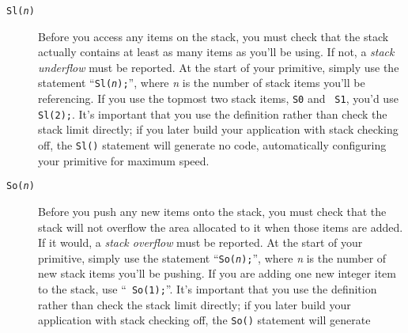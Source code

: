 \documentclass[twocolumn]{article}
\begin{document}
\begin{description}
\item[{\tt Sl({\em n})}]        Before you access any items on the
                                stack, you must check that the stack
                                actually contains at least as many 
                                items as you'll be using.  If not,
                                a {\em stack underflow} must be
                                reported.  At the start of your
                                primitive, simply use the statement
                                ``{\tt Sl({\em n});}'', where {\em n}
                                is the number of stack items you'll be
                                referencing.  If you use the topmost
                                two stack items, {\tt S0} and {\tt
                                S1}, you'd use {\tt Sl(2);}.  It's
                                important that you use the definition
                                rather than check the stack limit
                                directly; if you later build your
                                application with stack checking off,
                                the {\tt Sl()} statement will generate
                                no code, automatically configuring
                                your primitive for maximum speed.
\item[{\tt So({\em n})}]        Before you push any new items onto the
                                stack, you must check that the stack
                                will not overflow the area allocated
                                to it when those items are added.
                                If it would,
                                a {\em stack overflow} must be
                                reported.  At the start of your
                                primitive, simply use the statement
                                ``{\tt So({\em n});}'', where {\em n}
                                is the number of new stack items you'll be
                                pushing.  If you are adding one new
                                integer item to the stack, use ``{\tt
                                So(1);}''.  It's
                                important that you use the definition
                                rather than check the stack limit
                                directly; if you later build your
                                application with stack checking off,
                                the {\tt So()} statement will generate

\end{description}
\end{document}
